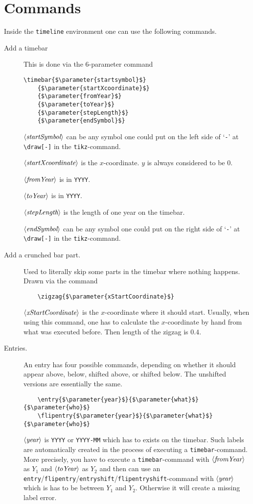 \documentclass{article}
\newcommand{\parameter}[1]{\langle\normalfont\textit{#1}\rangle}
\begin{document}
\section{Commands}
Inside the \texttt{timeline} environment one can use the following commands.
\begin{description}
	\item[Add a timebar] This is done via the 6-parameter command
\begin{lstlisting}
\timebar{$\parameter{startsymbol}$}
	{$\parameter{startXcoordinate}$}
	{$\parameter{fromYear}$}
	{$\parameter{toYear}$}
	{$\parameter{stepLength}$}
	{$\parameter{endSymbol}$}
\end{lstlisting}
		$\parameter{startSymbol}$ can be any symbol one could put on the left side of `\verb'-'' at \verb'\draw[-]' in the \texttt{tikz}-command.
		
		$\parameter{startXcoordinate}$ is the $x$-coordinate. $y$ is always considered to be $0$.
		
		$\parameter{fromYear}$ is in \texttt{YYYY}.
		
		$\parameter{toYear}$ is in \texttt{YYYY}.
		
		$\parameter{stepLength}$ is the length of one year on the timebar.
		
		$\parameter{endSymbol}$ can be any symbol one could put on the right side of `\verb'-'' at \verb'\draw[-]' in the \texttt{tikz}-command.
	\item[Add a crunched bar part.] Used to literally skip some parts in the timebar where nothing happens. Drawn via the command
\begin{lstlisting}
	\zigzag{$\parameter{xStartCoordinate}$}
\end{lstlisting}
$\parameter{xStartCoordinate}$ is the $x$-coordinate where it should start. Usually, when using this command, one has to calculate the $x$-coordinate by hand from what was executed before.
Then length of the zigzag is $0.4$.

\item[Entries.] An entry has four possible commands, depending on whether it should appear above, below, shifted above, or shifted below. The unshifted versions are essentially the same.
\begin{lstlisting}
	\entry{$\parameter{year}$}{$\parameter{what}$}{$\parameter{who}$}
	\flipentry{$\parameter{year}$}{$\parameter{what}$}{$\parameter{who}$}
\end{lstlisting}
$\parameter{year}$ is \texttt{YYYY} or \texttt{YYYY-MM} which has to exists on the timebar. 
Such labels are automatically created in the process of executing a \texttt{timebar}-command. 
More precisely, you have to execute a \texttt{timebar}-command with $\parameter{fromYear}$ as $Y_1$ and $\parameter{toYear}$ as $Y_2$ and then can use an \texttt{entry}/\texttt{flipentry}/\texttt{entryshift}/\texttt{flipentryshift}-command with $\parameter{year}$ which is has to be between $Y_1$ and $Y_2$.
Otherwise it will create a missing label error.


\end{description}
\end{document}
